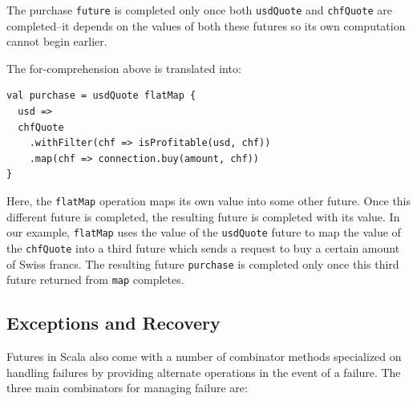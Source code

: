 The purchase \verb|future| is completed only once both \verb|usdQuote| and
\verb|chfQuote| are completed--it depends on the values of both these futures so
its own computation cannot begin earlier.

The for-comprehension above is translated into:
\begin{verbatim}
val purchase = usdQuote flatMap {
  usd =>
  chfQuote
    .withFilter(chf => isProfitable(usd, chf))
    .map(chf => connection.buy(amount, chf))
}
\end{verbatim}

Here, the \verb|flatMap| operation maps its own value into some other future.
Once this different future is completed, the resulting future is completed with
its value. In our example, \verb|flatMap| uses the value of the \verb|usdQuote|
future to map the value of the \verb|chfQuote| into a third future which sends a
request to buy a certain amount of Swiss francs. The resulting future
\verb|purchase| is completed only once this third future returned from
\verb|map| completes.




%
%
%
%

%

\subsection{Exceptions and Recovery}
\label{sec:futures-exceptions}

Futures in Scala also come with a number of combinator methods specialized on
handling failures by providing alternate operations in the event of a failure.
The three main combinators for managing failure are:

